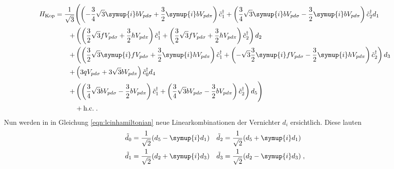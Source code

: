 \begin{equation}
    \begin{split}
    H_\text{Kop} = \frac{1}{\sqrt{3}} 
        &\Biggl(   \left   (-\frac{3}{4}\sqrt{3}   \symup{i}    b   V_{pd\sigma} + \frac{3}{2}  \symup{i}   b   V_{pd\pi} \right ) \tilde{c}^\dagger_1  
                    +\left  ( \frac{3}{4}\sqrt{3}   \symup{i}    b   V_{pd\sigma} - \frac{3}{2}  \symup{i}   b   V_{pd\pi} \right ) \tilde{c}^\dagger_2            d_1\\
        +&\left (    \left  ( \frac{3}{2}\sqrt{3}                           f   V_{pd\sigma} + \frac{3}{2}              h   V_{pd\pi} \right ) \tilde{c}^\dagger_1          
                    +\left  ( \frac{3}{2}\sqrt{3}                           f   V_{pd\sigma} + \frac{3}{2}              h   V_{pd\pi} \right ) \tilde{c}^\dagger_2 \right ) d_2\\
        +&\left (    \left  ( \frac{3}{2}\sqrt{3}               \symup{i}   f   V_{pd\sigma} + \frac{3}{2}  \symup{i}   h   V_{pd\pi} \right ) \tilde{c}^\dagger_1  
                    +\left  (-\sqrt{3}\frac{3}{2}               \symup{i}   f   V_{pd\sigma} - \frac{3}{2}  \symup{i}   h   V_{pd\pi} \right ) \tilde{c}^\dagger_2 \right ) d_3\\
        +&\left (   3 q V_{pd\sigma} + 3 \sqrt{3}  b V_{pd\pi} \right )    \tilde{c}^\dagger_0                                                                              d_4\\
        +&\left (   \left   ( \frac{3}{4}\sqrt{3}                           b   V_{pd\sigma} - \frac{3}{2}              b   V_{pd\pi} \right ) \tilde{c}^\dagger_1  
                    +\left  ( \frac{3}{4}\sqrt{3}                           b   V_{pd\sigma} - \frac{3}{2}              b   V_{pd\pi} \right ) \tilde{c}^\dagger_2 \right ) d_5 \Biggr) \\
                    & + \text{h.c.} \; .
                 \end{split}
      \label{eqn:lcinhamiltonian}
\end{equation} 
Nun werden in in Gleichung \eqref{eqn:lcinhamiltonian} neue Linearkombinationen der Vernichter $d_i$ ersichtlich.
Diese lauten 
\begin{equation}
    \begin{aligned}
    \tilde{d}_0 &= \frac{1}{\sqrt{2}} (d_5-\symup{i}d_1) & \tilde{d}_2 &= \frac{1}{\sqrt{2}} (d_5+\symup{i}d_1) \\
    \tilde{d}_1 &= \frac{1}{\sqrt{2}} (d_2+\symup{i}d_3) & \tilde{d}_3 &= \frac{1}{\sqrt{2}} (d_2-\symup{i}d_3) \; , \label{eqn:newdi}
    \end{aligned}
\end{equation}
